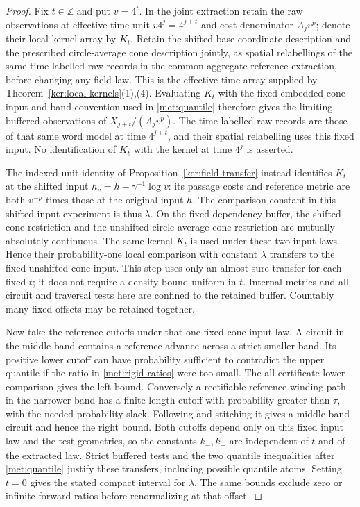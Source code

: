 \documentclass[11pt]{article}
\numberwithin{equation}{section}
\theoremstyle{definition}
\theoremstyle{remark}
\newcommand{\1}{\mathbf 1}
\begin{document}
\begin{proof}
Fix $t\in\mathbb Z$ and put $v=4^t$.  In the joint extraction retain
the raw observations at effective time unit $v4^j=4^{j+t}$ and cost
denominator $A_jv^p$; denote their local kernel array by $K_t$.
Retain the shifted-base-coordinate description and the prescribed
circle-average cone description jointly, as spatial relabellings
of the same time-labelled raw records in the common aggregate
reference extraction, before changing any field law.
This is the effective-time array supplied by
Theorem~\ref{ker:local-kernels}(1),(4).  Evaluating $K_t$ with the
fixed embedded cone input and band convention used in
\eqref{met:quantile} therefore gives the limiting buffered
observations of $X_{j+t}/(A_jv^p)$.  The time-labelled raw records
are those of that same word model at time $4^{j+t}$, and their spatial
relabelling uses this fixed input.  No identification of $K_t$ with
the kernel at time $4^j$ is asserted.

The indexed unit identity of Proposition~\ref{ker:field-transfer}
instead identifies $K_t$ at the shifted input
$h_v=h-\gamma^{-1}\log v$: its passage costs and reference metric
are both $v^{-p}$ times those at the original input $h$.
The comparison constant in this shifted-input experiment is thus
$\lambda$.  On the fixed dependency buffer, the shifted cone
restriction and the unshifted circle-average cone restriction are
mutually absolutely continuous.  The same kernel $K_t$ is used under
these two input laws.  Hence their probability-one local comparison
with constant $\lambda$ transfers to the fixed unshifted cone input.
This step uses only an almost-sure transfer for each fixed $t$;
it does not require a density bound uniform in $t$.  Internal metrics
and all circuit and traversal tests here are confined to the retained
buffer.  Countably many fixed offsets may be retained together.

Now take the reference cutoffs under that one fixed cone input law.
A circuit in the middle band contains a reference advance across
a strict smaller band.  Its positive lower cutoff can have probability
sufficient to contradict the upper quantile if the ratio in
\eqref{met:rigid-ratios} were too small.  The all-certificate lower
comparison gives the left bound.  Conversely a rectifiable reference
winding path in the narrower band has a finite-length cutoff with
probability greater than $\tau$, with the needed probability slack.
Following and stitching it gives a middle-band circuit and hence the
right bound.  Both cutoffs depend only on this fixed input law and
the test geometries, so the constants $k_-,k_+$ are independent of
$t$ and of the extracted law.  Strict buffered tests and the two
quantile inequalities after \eqref{met:quantile} justify these
transfers, including possible quantile atoms.  Setting $t=0$ gives
the stated compact interval for $\lambda$.  The same bounds exclude
zero or infinite forward ratios before renormalizing at that offset.
\end{proof}
\end{document}
